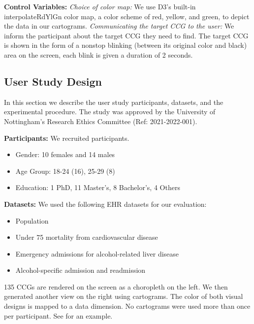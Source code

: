 \documentclass[Afour,sagev,times]{sagej}
\newcommand{\bobgraph}[1]{\noindent\textbf{#1}}
\begin{document}
\bobgraph{Control Variables: }\textit{Choice of color map:} We use D3's built-in interpolateRdYlGn color map, a color scheme of red, yellow, and green, to depict the data in our cartograms.
\textit{Communicating the target CCG to the user:} We inform the participant about the target CCG they need to find.
The target CCG is shown in the form of a nonstop blinking (between its original color and black) area on the screen, each blink is given a duration of 2 seconds.

\subsection{User Study Design}\label{subsec:{User Study Design}}

In this section we describe the user study participants, datasets, and the experimental procedure.
The study was approved by the University of Nottingham's Research Ethics Committee (Ref: 2021-2022-001).

\bobgraph{Participants:} We recruited \pCount participants.

\begin{itemize}
    \setlength\itemsep{0px}
    \item Gender: 10 females and 14 males
    \item Age Group: 18-24 (16), 25-29 (8)
    \item Education: 1 PhD, 11 Master's, 8 Bachelor's, 4 Others
\end{itemize}

\bobgraph{Datasets:} We used the following EHR datasets for our evaluation:

\begin{itemize}
    \setlength\itemsep{0px}
    \item Population
    \item Under 75 mortality from cardiovascular disease
    \item Emergency admissions for alcohol-related liver disease
    \item Alcohol-specific admission and readmission
\end{itemize}

135 CCGs are rendered on the screen as a choropleth on the left.
We then generated another view on the right using cartograms.
The color of both visual designs is mapped to a data dimension.
No cartograms were used more than once per participant.
See  for an example.
\end{document}

